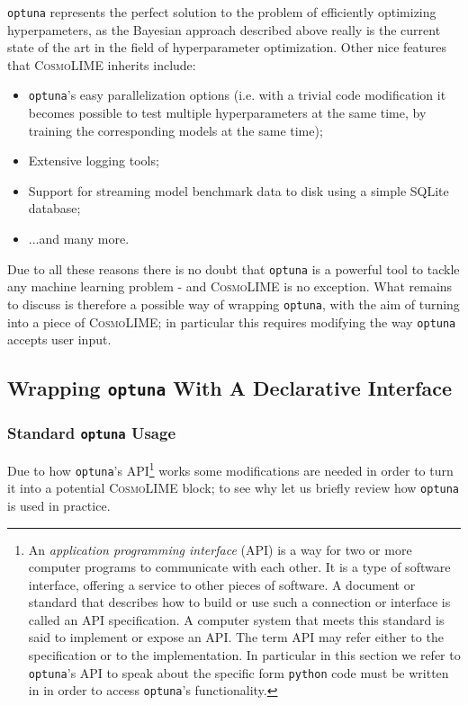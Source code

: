 \texttt{optuna} represents the perfect solution to the problem of efficiently optimizing hyperpameters, as the Bayesian approach described above really is the current state of the art in the field of hyperparameter optimization. Other nice features that \textsc{CosmoLIME} inherits include:
\begin{itemize}
    \item \texttt{optuna}'s easy parallelization options (i.e. with a trivial code modification it becomes possible to test multiple hyperparameters at the same time, by training the corresponding models at the same time);
    \item Extensive logging tools;
    \item Support for streaming model benchmark data to disk using a simple SQLite database;
    \item ...and many more.
\end{itemize}
Due to all these reasons there is no doubt that \texttt{optuna} is a powerful tool to tackle any machine learning problem - and \textsc{CosmoLIME} is no exception. What remains to discuss is therefore a possible way of wrapping \texttt{optuna}, with the aim of turning into a piece of \textsc{CosmoLIME}; in particular this requires modifying the way \texttt{optuna} accepts user input.

\subsection{Wrapping \texttt{optuna} With A Declarative Interface}
\subsubsection{Standard \texttt{optuna} Usage}
Due to how \texttt{optuna}'s API\footnote{An \emph{application programming interface} (API) is a way for two or more computer programs to communicate with each other. It is a type of software interface, offering a service to other pieces of software. A document or standard that describes how to build or use such a connection or interface is called an API specification. A computer system that meets this standard is said to implement or expose an API. The term API may refer either to the specification or to the implementation. In particular in this section we refer to \texttt{optuna}'s API to speak about the specific form \texttt{python} code must be written in in order to access \texttt{optuna}'s functionality.} works some modifications are needed in order to turn it into a potential \textsc{CosmoLIME} block; to see why let us briefly review how \texttt{optuna} is used in practice.

